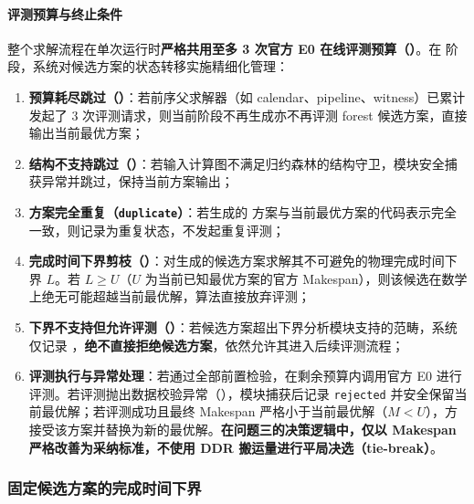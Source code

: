 \documentclass[anonymous,withtoc]{gmcm2026}
\providecommand{\tightlist}{\setlength{\itemsep}{0pt}\setlength{\parskip}{0pt}}
\begin{document}
\paragraph{评测预算与终止条件}

整个求解流程在单次运行时\textbf{严格共用至多 3 次官方 E0 在线评测预算（\texttt{}）}。在 \texttt{} 阶段，系统对候选方案的状态转移实施精细化管理：

\begin{enumerate}
\def\labelenumi{\arabic{enumi}.}
\tightlist
\item
  \textbf{预算耗尽跳过（\texttt{}）}：若前序父求解器（如 calendar、pipeline、witness）已累计发起了 3 次评测请求，则当前阶段不再生成亦不再评测 forest 候选方案，直接输出当前最优方案；
\item
  \textbf{结构不支持跳过（\texttt{}）}：若输入计算图不满足归约森林的结构守卫，模块安全捕获异常并跳过，保持当前方案输出；
\item
  \textbf{方案完全重复（\texttt{duplicate}）}：若生成的 \texttt{} 方案与当前最优方案的代码表示完全一致，则记录为重复状态，不发起重复评测；
\item
  \textbf{完成时间下界剪枝（\texttt{}）}：对生成的候选方案求解其不可避免的物理完成时间下界 \(L\)。若 \(L \ge U\)（\(U\) 为当前已知最优方案的官方 Makespan），则该候选在数学上绝无可能超越当前最优解，算法直接放弃评测；
\item
  \textbf{下界不支持但允许评测（\texttt{}）}：若候选方案超出下界分析模块支持的范畴，系统仅记录 \texttt{}，\textbf{绝不直接拒绝候选方案}，依然允许其进入后续评测流程；
\item
  \textbf{评测执行与异常处理}：若通过全部前置检验，在剩余预算内调用官方 E0 进行评测。若评测抛出数据校验异常（\texttt{}），模块捕获后记录 \texttt{rejected} 并安全保留当前最优解；若评测成功且最终 Makespan 严格小于当前最优解（\(M < U\)），方接受该方案并替换为新的最优解。\textbf{在问题三的决策逻辑中，仅以 Makespan 严格改善为采纳标准，不使用 DDR 搬运量进行平局决选（tie-break）}。
\end{enumerate}

\subsubsection{固定候选方案的完成时间下界}
\end{document}
